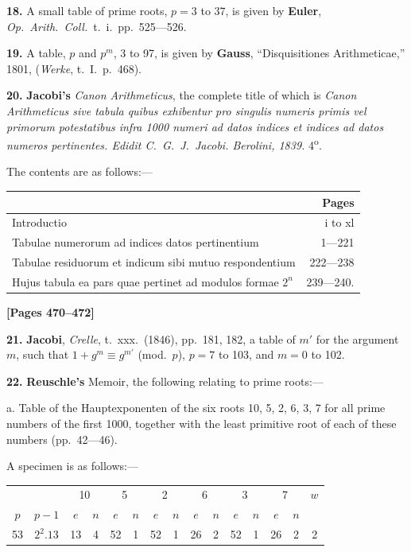\documentclass[11pt,a4paper]{article}
\begin{document}
\textbf{18.} A small table of prime roots, $p = 3$ to 37, is given by
\quad\textbf{Euler}, \textit{Op.\ Arith.\ Coll.}\ t.\ i.\ pp.\ 525---526.

\textbf{19.} A table, $p$ and $p^{m}$, 3 to 97, is given by
\quad\textbf{Gauss}, ``Disquisitiones Arithmeticae,'' 1801, (\textit{Werke}, t.\ I.\ p.\ 468).

\textbf{20.} \textbf{Jacobi's} \textit{Canon Arithmeticus}, the complete title of which is
\quad\textit{Canon Arithmeticus sive tabula quibus exhibentur pro singulis numeris primis vel primorum potestatibus infra 1000 numeri ad datos indices et indices ad datos numeros pertinentes. Edidit C.\ G.\ J.\ Jacobi. Berolini, 1839.} 4\textsuperscript{o}.

The contents are as follows:---
\begin{center}
\begin{tabular}{l|r}
 & Pages \\
\hline
Introductio & i to xl \\
Tabulae numerorum ad indices datos pertinentium & 1---221 \\
Tabulae residuorum et indicum sibi mutuo respondentium & 222---238 \\
Hujus tabula ea pars quae pertinet ad modulos formae $2^{n}$ & 239---240. \\
\end{tabular}
\end{center}

\newpage
\textbf{[Pages 470--472]}

\textbf{21.} \textbf{Jacobi}, \textit{Crelle}, t.\ xxx.\ (1846), pp.\ 181, 182, a table of $m'$ for the argument $m$,
such that $1 + g^{m} \equiv g^{m'}$ (mod.\ $p$), $p = 7$ to 103, and $m = 0$ to 102.

\textbf{22.} \textbf{Reuschle's} Memoir, the following relating to prime roots:---

a. Table of the Hauptexponenten of the six roots 10, 5, 2, 6, 3, 7 for all prime numbers of the first 1000,
together with the least primitive root of each of these numbers (pp.\ 42---46).

A specimen is as follows:---
\begin{center}
\begin{tabular}{c|c|cc|cc|cc|cc|cc|cc|c}
 & & \multicolumn{2}{c|}{10} & \multicolumn{2}{c|}{5} & \multicolumn{2}{c|}{2} & \multicolumn{2}{c|}{6} & \multicolumn{2}{c|}{3} & \multicolumn{2}{c|}{7} & $w$ \\
$p$ & $p-1$ & $e$ & $n$ & $e$ & $n$ & $e$ & $n$ & $e$ & $n$ & $e$ & $n$ & $e$ & $n$ \\
\hline
53 & $2^{2}.13$ & 13 & 4 & 52 & 1 & 52 & 1 & 26 & 2 & 52 & 1 & 26 & 2 & 2 \\
\end{tabular}
\end{center}
\end{document}
